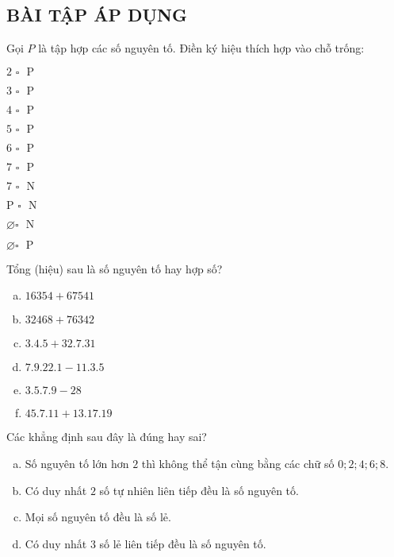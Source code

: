 \subsection{BÀI TẬP ÁP DỤNG}
\begin{bt}
Gọi $P$ là tập hợp các số nguyên tố. Điền ký hiệu thích hợp vào chỗ trống:
\begin{multicols}{5}
\item $\text{2 }\square\text{ }\mathrm{P}$
\item $\text{3 }\square\text{ }\mathrm{P}$
\item $\text{4 }\square\text{ }\mathrm{P}$
\item $\text{5 }\square\text{ }\mathrm{P}$
\item $\text{6 }\square\text{ }\mathrm{P}$
\item $\text{7 }\square\text{ }\mathrm{P}$
\item $\text{7 }\square\text{ }\mathrm{N}$
\item $\text{P }\square\text{ }\mathrm{N}$
\item $\varnothing \square\text{ }\mathrm{N}$
\item $\varnothing \square\text{ }\mathrm{P}$
\end{multicols}

\end{bt}   \begin{bt}
Tổng (hiệu) sau là số nguyên tố hay hợp số?
\begin{multicols}{2}
\begin{enumerate}[a)]
\item $16354 + 67541$
\item $32468 + 76342$
\item $3.4.5 + 32.7.31$
\item $7.9.22.1 - 11.3.5$
\item $3.5.7.9 - 28$
\item $45.7.11 + 13.17.19$
\end{enumerate}
\end{multicols}
\end{bt}   \begin{bt}
Các khẳng định sau đây là đúng hay sai?
\begin{enumerate}[a)]
\item Số nguyên tố lớn hơn $2$ thì không thể tận cùng bằng các chữ số $0; 2;4; 6; 8$.
\item Có duy nhất $2$ số tự nhiên liên tiếp đều là số nguyên tố.
\item Mọi số nguyên tố đều là số lẻ.
\item Có duy nhất $3$ số lẻ liên tiếp đều là số nguyên tố.
\end{enumerate}

\end{bt}
